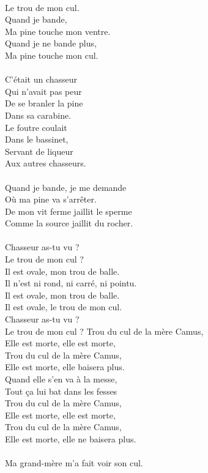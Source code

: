 \\Le trou de mon cul.
\\Quand je bande,
\\Ma pine touche mon ventre.
\\Quand je ne bande plus,
\\Ma pine touche mon cul.
\\\\C'était un chasseur 
\\Qui n'avait pas peur
\\De se branler la pine 
\\Dans sa carabine.
\\Le foutre coulait 
\\Dans le bassinet,
\\Servant de liqueur 
\\Aux autres chasseurs.
\\\\Quand je bande, je me demande
\\Où ma pine va s'arrêter.
\\De mon vit ferme jaillit le sperme
\\Comme la source jaillit du rocher.
\\\\Chasseur as-tu vu ?
\\Le trou de mon cul ?
\\Il est ovale, mon trou de balle.
\\Il n'est ni rond, ni carré, ni pointu.
\\Il est ovale, mon trou de balle.
\\Il est ovale, le trou de mon cul.
\\Chasseur as-tu vu ?
\\Le trou de mon cul ?
\breakpage
Trou du cul de la mère Camus,
\\Elle est morte, elle est morte,
\\Trou du cul de la mère Camus,
\\Elle est morte, elle baisera plus.
\\Quand elle s'en va à la messe,
\\Tout ça lui bat dans les fesses
\\Trou du cul de la mère Camus,
\\Elle est morte, elle est morte,
\\Trou du cul de la mère Camus,
\\Elle est morte, elle ne baisera plus.
\\\\Ma grand-mère m'a fait voir son cul.
